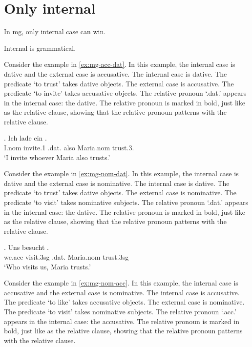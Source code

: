 \section{Only internal}

In \ac{mg}, only internal case can win.

Internal is grammatical.

Consider the example in \ref{ex:mg-acc-dat}. In this example, the internal case is dative and the external case is accusative.
The internal case is dative. The predicate  `to trust' takes dative objects.
The external case is accusative. The predicate  `to invite' takes accusative objects.
The relative pronoun  `.\ac{dat}.' appears in the internal case: the dative. The relative pronoun is marked in bold, just like as the relative clause, showing that the relative pronoun patterns with the relative clause.

\exg. Ich {lade ein}    . \\
I.\ac{nom} invite.1\scsub{[acc]} .\ac{dat}. also Maria.\ac{nom} trust.3\scsub{[dat]}.\\
`I invite whoever Maria also trusts.' \label{ex:mg-acc-dat}

Consider the example in \ref{ex:mg-nom-dat}. In this example, the internal case is dative and the external case is nominative.
The internal case is dative. The predicate  `to trust' takes dative objects.
The external case is nominative. The predicate  `to visit' takes nominative subjects.
The relative pronoun  `.\ac{dat}.' appears in the internal case: the dative. The relative pronoun is marked in bold, just like as the relative clause, showing that the relative pronoun patterns with the relative clause.

\exg. Uns besucht   .\\
we.\ac{acc} visit.3\ac{sg}\scsub{[nom]} .\ac{dat}. Maria.\ac{nom} trust.3\ac{sg}\scsub{[dat]}\\
`Who visits us, Maria trusts.' \label{ex:mg-nom-dat}

Consider the example in \ref{ex:mg-nom-acc}. In this example, the internal case is accusative and the external case is nominative.
The internal case is accusative. The predicate  `to like' takes accusative objects.
The external case is nominative. The predicate  `to visit' takes nominative subjects.
The relative pronoun  `.\ac{acc}.' appears in the internal case: the accusative. The relative pronoun is marked in bold, just like as the relative clause, showing that the relative pronoun patterns with the relative clause.


